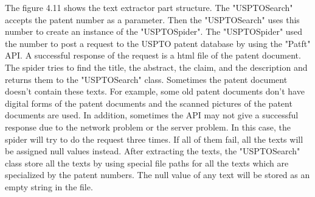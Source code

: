 The figure 4.11 shows the text extractor part structure. The "USPTOSearch"  accepts the patent number as a parameter. Then the "USPTOSearch" uses this number to create an instance of the "USPTOSpider". The "USPTOSpider" used the number to post a request to the USPTO patent database by using the "Patft" API. A successful response of the request is a html file of the patent document. The spider tries to find the title, the abstract, the claim, and the description and returns them to the "USPTOSearch" class. Sometimes the patent document doesn't contain these texts. For example, some old patent documents don't have digital forms of the patent documents and the scanned pictures of the patent documents are used. In addition, sometimes the API may not give a successful response due to the network problem or the server problem. In this case, the spider will try to do the request three times. If all of them fail, all the texts will be assigned  null values instead. After extracting the texts, the "USPTOSearch" class store all the texts by using special file paths for all the texts which are specialized by the patent numbers. The null value of any text will be stored as an empty string in the file. 


